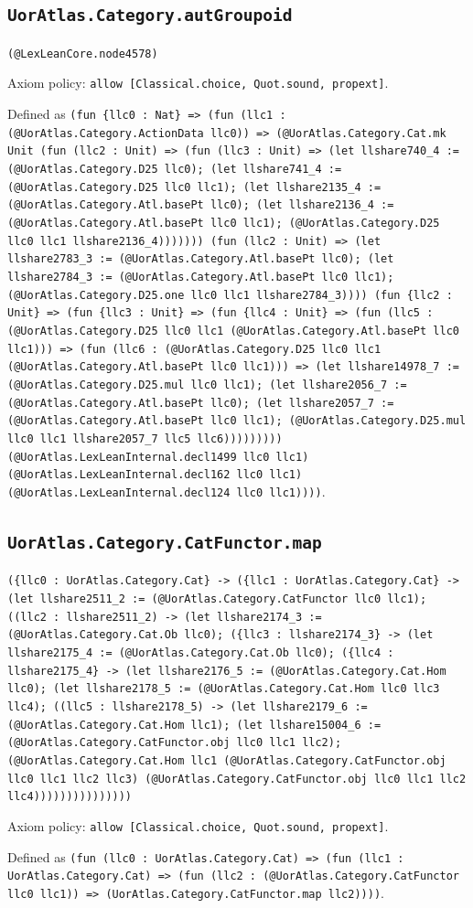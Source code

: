 \documentclass[11pt]{article}
\begin{document}
\subsection*{\texttt{UorAtlas.Category.autGroupoid}}
\noindent\texttt{(@LexLeanCore.node4578)}\par
\noindent Axiom policy: \texttt{allow [Classical.choice, Quot.sound, propext]}.\par
\noindent Defined as \texttt{(fun \{llc0 : Nat\} => (fun (llc1 : (@UorAtlas.Category.ActionData llc0)) => (@UorAtlas.Category.Cat.mk Unit (fun (llc2 : Unit) => (fun (llc3 : Unit) => (let llshare740\_4 := (@UorAtlas.Category.D25 llc0); (let llshare741\_4 := (@UorAtlas.Category.D25 llc0 llc1); (let llshare2135\_4 := (@UorAtlas.Category.Atl.basePt llc0); (let llshare2136\_4 := (@UorAtlas.Category.Atl.basePt llc0 llc1); (@UorAtlas.Category.D25 llc0 llc1 llshare2136\_4))))))) (fun (llc2 : Unit) => (let llshare2783\_3 := (@UorAtlas.Category.Atl.basePt llc0); (let llshare2784\_3 := (@UorAtlas.Category.Atl.basePt llc0 llc1); (@UorAtlas.Category.D25.one llc0 llc1 llshare2784\_3)))) (fun \{llc2 : Unit\} => (fun \{llc3 : Unit\} => (fun \{llc4 : Unit\} => (fun (llc5 : (@UorAtlas.Category.D25 llc0 llc1 (@UorAtlas.Category.Atl.basePt llc0 llc1))) => (fun (llc6 : (@UorAtlas.Category.D25 llc0 llc1 (@UorAtlas.Category.Atl.basePt llc0 llc1))) => (let llshare14978\_7 := (@UorAtlas.Category.D25.mul llc0 llc1); (let llshare2056\_7 := (@UorAtlas.Category.Atl.basePt llc0); (let llshare2057\_7 := (@UorAtlas.Category.Atl.basePt llc0 llc1); (@UorAtlas.Category.D25.mul llc0 llc1 llshare2057\_7 llc5 llc6))))))))) (@UorAtlas.LexLeanInternal.decl1499 llc0 llc1) (@UorAtlas.LexLeanInternal.decl162 llc0 llc1) (@UorAtlas.LexLeanInternal.decl124 llc0 llc1))))}.\par
\subsection*{\texttt{UorAtlas.Category.CatFunctor.map}}
\noindent\texttt{(\{llc0 : UorAtlas.Category.Cat\} -> (\{llc1 : UorAtlas.Category.Cat\} -> (let llshare2511\_2 := (@UorAtlas.Category.CatFunctor llc0 llc1); ((llc2 : llshare2511\_2) -> (let llshare2174\_3 := (@UorAtlas.Category.Cat.Ob llc0); (\{llc3 : llshare2174\_3\} -> (let llshare2175\_4 := (@UorAtlas.Category.Cat.Ob llc0); (\{llc4 : llshare2175\_4\} -> (let llshare2176\_5 := (@UorAtlas.Category.Cat.Hom llc0); (let llshare2178\_5 := (@UorAtlas.Category.Cat.Hom llc0 llc3 llc4); ((llc5 : llshare2178\_5) -> (let llshare2179\_6 := (@UorAtlas.Category.Cat.Hom llc1); (let llshare15004\_6 := (@UorAtlas.Category.CatFunctor.obj llc0 llc1 llc2); (@UorAtlas.Category.Cat.Hom llc1 (@UorAtlas.Category.CatFunctor.obj llc0 llc1 llc2 llc3) (@UorAtlas.Category.CatFunctor.obj llc0 llc1 llc2 llc4)))))))))))))))}\par
\noindent Axiom policy: \texttt{allow [Classical.choice, Quot.sound, propext]}.\par
\noindent Defined as \texttt{(fun (llc0 : UorAtlas.Category.Cat) => (fun (llc1 : UorAtlas.Category.Cat) => (fun (llc2 : (@UorAtlas.Category.CatFunctor llc0 llc1)) => (UorAtlas.Category.CatFunctor.map llc2))))}.\par
\end{document}
